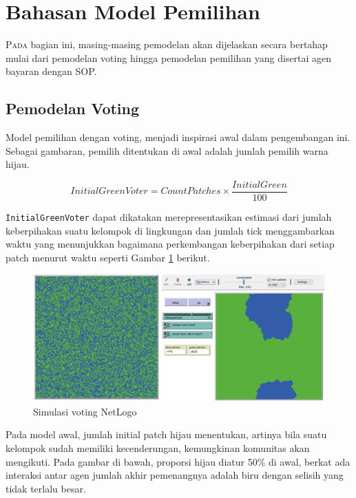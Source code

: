 \section{Bahasan Model Pemilihan}

\lettrine[nindent=-0.01em,findent=0.2em]{P}{ada} bagian ini, masing-masing pemodelan akan dijelaskan secara bertahap mulai dari pemodelan voting hingga pemodelan pemilihan yang disertai agen bayaran dengan SOP.

\subsection{Pemodelan Voting}

Model pemilihan dengan voting, menjadi inspirasi awal dalam pengembangan ini. Sebagai gambaran, pemilih ditentukan di awal adalah jumlah pemilih warna hijau.

\begin{equation}
	InitialGreenVoter = CountPatches \times \frac{InitialGreen}{100}
\end{equation}

\texttt{InitialGreenVoter} dapat dikatakan merepresentasikan estimasi dari jumlah keberpihakan suatu kelompok di lingkungan dan jumlah tick menggambarkan waktu yang menunjukkan bagaimana perkembangan keberpihakan dari setiap patch menurut waktu seperti Gambar \ref{fig:initvoter} berikut.

\begin{figure}[H]
	\centering
	\includegraphics[width=\linewidth]{images/ch03/InitVoter}
	\caption{Simulasi voting NetLogo}
	\label{fig:initvoter}
\end{figure}

Pada model awal, jumlah initial patch hijau menentukan, artinya bila suatu kelompok sudah memiliki kecenderungan, kemungkinan komunitas akan mengikuti. Pada gambar di bawah, proporsi hijau diatur 50\% di awal, berkat ada interaksi antar agen jumlah akhir pemenangnya adalah biru dengan selisih yang tidak terlalu besar.

